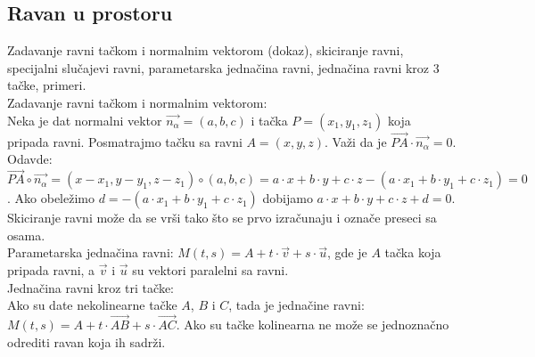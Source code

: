 \documentclass[12pt]{article}
\newcommand{\vek}[1]{\overrightarrow{#1}}
\begin{document}
    \subsection{Ravan u prostoru}
    Zadavanje ravni tačkom i normalnim vektorom (dokaz),
    skiciranje ravni, specijalni slučajevi ravni, parametarska
    jednačina ravni, jednačina ravni kroz 3 tačke, primeri.
    \\[1cm]
    Zadavanje ravni tačkom i normalnim vektorom:\\
    Neka je dat normalni vektor $\vek{n_\alpha}=(a,b,c)$
    i tačka $P=(x_1,y_1,z_1)$ koja pripada ravni.
    Posmatrajmo tačku sa ravni $A=(x,y,z)$. Važi da
    je $\vek{PA}\cdot\vek{n_\alpha}=0$.
    Odavde:
$\vek{PA}\circ\vek{n_\alpha}=(x-x_1,y-y_1,z-z_1)\circ(a,b,c)=a\cdot x+b\cdot y+c\cdot z-(a\cdot x_1+b\cdot y_1+c\cdot z_1)=0$.
    Ako obeležimo $d=-(a\cdot x_1+b\cdot y_1+c\cdot z_1)$ dobijamo $a\cdot x+b\cdot y+c\cdot z+d=0$.
    Skiciranje ravni može da se vrši tako što se prvo izračunaju i označe preseci sa osama.\\
    Parametarska jednačina ravni: $M(t,s)=A+t\cdot\vek{v}+s\cdot\vek{u}$,
    gde je $A$ tačka koja pripada ravni, a $\vek{v}$ i $\vek{u}$
    su vektori paralelni sa ravni.\\
    Jednačina ravni kroz tri tačke:\\
    Ako su date nekolinearne tačke $A$, $B$ i $C$, tada
    je jednačine ravni: $M(t,s)=A+t\cdot\vek{AB}+s\cdot\vek{AC}$.
    Ako su tačke kolinearna ne može se jednoznačno odrediti ravan koja ih sadrži.
    \par
\end{document}
